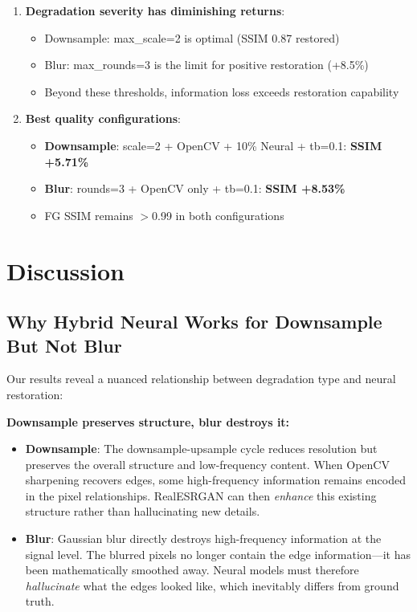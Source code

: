 \documentclass[11pt,a4paper]{article}
\begin{document}
\begin{enumerate}
    \item \textbf{Degradation severity has diminishing returns}:
    \begin{itemize}
        \item Downsample: max\_scale=2 is optimal (SSIM 0.87 restored)
        \item Blur: max\_rounds=3 is the limit for positive restoration (+8.5\%)
        \item Beyond these thresholds, information loss exceeds restoration capability
    \end{itemize}
    
    \item \textbf{Best quality configurations}:
    \begin{itemize}
        \item \textbf{Downsample}: scale=2 + OpenCV + 10\% Neural + tb=0.1: \textbf{SSIM +5.71\%}
        \item \textbf{Blur}: rounds=3 + OpenCV only + tb=0.1: \textbf{SSIM +8.53\%}
        \item FG SSIM remains $>$0.99 in both configurations
    \end{itemize}
\end{enumerate}

\section{Discussion}

\subsection{Why Hybrid Neural Works for Downsample But Not Blur}

Our results reveal a nuanced relationship between degradation type and neural restoration:

\textbf{Downsample preserves structure, blur destroys it:}
\begin{itemize}
    \item \textbf{Downsample}: The downsample-upsample cycle reduces resolution but preserves the overall structure and low-frequency content. When OpenCV sharpening recovers edges, some high-frequency information remains encoded in the pixel relationships. RealESRGAN can then \emph{enhance} this existing structure rather than hallucinating new details.
    
    \item \textbf{Blur}: Gaussian blur directly destroys high-frequency information at the signal level. The blurred pixels no longer contain the edge information---it has been mathematically smoothed away. Neural models must therefore \emph{hallucinate} what the edges looked like, which inevitably differs from ground truth.
\end{itemize}
\end{document}
